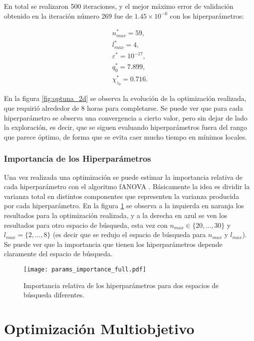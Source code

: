 En total se realizaron 500 iteraciones, y el mejor máximo error de validación obtenido en la iteración número 269 fue de $1{.}45\times 10^{-6}$ con los hiperparámetros:

\begin{align*}
&n_{max}^* = 59, \\
 &l_{max}^* = 4, \\
&\varepsilon^* = 10^{-17},\\
 &q_0^* = 7.899, \\
 &\chi_{z_0}^* = 0.716.
\end{align*}

En la figura \ref{fig:optuna_2d} se observa la evolución de la optimización realizada, que requirió alrededor de 8 horas para completarse. Se puede ver que para cada hiperparámetro se observa una convergencia a cierto valor, pero sin dejar de lado la exploración, es decir, que se siguen evaluando hiperparámetros fuera del rango que parece óptimo, de forma que se evita caer mucho tiempo en mínimos locales.


\subsubsection{Importancia de los Hiperparámetros}

Una vez realizada una optimización se puede estimar la importancia relativa de cada hiperparámetro con el algoritmo fANOVA \cite{pmlr-v32-hutter14}. Básicamente la idea es dividir la varianza total en distintos componentes que representen la varianza producida por cada hiperparámetro. En la figura \ref{fig:param_import} se observa a la izquierda en naranja los resultados para la optimización realizada, y a la derecha en azul se ven los resultados para otro espacio de búsqueda, esta vez con $n_{max} \in \{20, ..., 30\}$  y $l_{max} = \{2, ..., 8\}$ (es decir que se redujo el espacio de búsqueda para $n_{max}$ y $l_{max}$). Se puede ver que la importancia que tienen los hiperparámetros depende claramente del espacio de búsqueda.

\begin{figure}[h!]
\centering
\texttt{[image: params\_importance\_full.pdf]}
\caption{Importancia relativa de los hiperparámetros para dos espacios de búsqueda diferentes.}
\label{fig:param_import}
\end{figure}




\section{Optimización Multiobjetivo}

